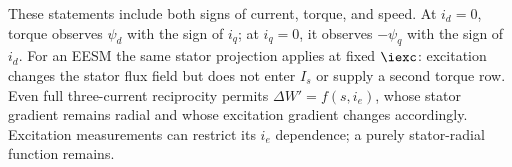 These statements include both signs of current, torque, and speed.
At $i_d=0$, torque observes $\psi_d$ with the sign of $i_q$; at $i_q=0$,
it observes $-\psi_q$ with the sign of $i_d$. For an EESM the same stator
projection applies at fixed $\iexc$: excitation changes the stator flux
field but does not enter $I_s$ or supply a second torque row.
Even full three-current reciprocity permits
$\Delta W'=f(s,i_e)$, whose stator gradient remains radial and whose
excitation gradient changes accordingly. Excitation measurements can
restrict its $i_e$ dependence; a purely stator-radial function remains.

